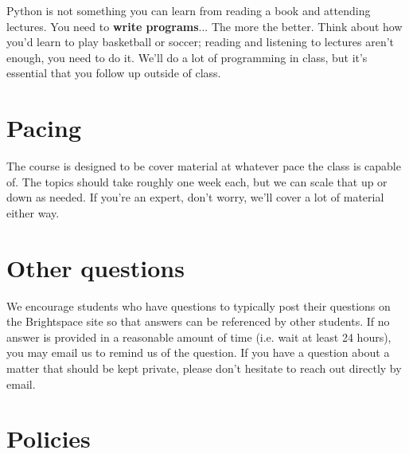 \documentclass[12pt,pdftex,twoside,letterpaper]{exam}
\begin{document}
  Python is not something you can learn from reading a book and attending lectures. You need to
  {\bf write programs}... The more the better. Think about how you'd learn to play basketball
  or soccer; reading and listening to lectures aren't enough, you need to do it. We'll do a lot of
  programming in class, but it's {essential} that you follow up outside of class.

\section*{Pacing}

  The course is designed to be cover material at whatever pace the class is capable of. The topics
  should take roughly one week each, but we can scale that up or down as needed. If you're an expert,
  don't worry, we'll cover a lot of material either way.

\section*{Other questions}

  We encourage students who have questions to typically post their questions on the Brightspace
  site so that answers can be referenced by other students. If no answer is provided in a reasonable
  amount of time (i.e. wait at least 24 hours), you may email us to remind us of the question. If you
  have a question about a matter that should be kept private, please don't hesitate to reach out
  directly by email.


\section*{Policies}
\end{document}
